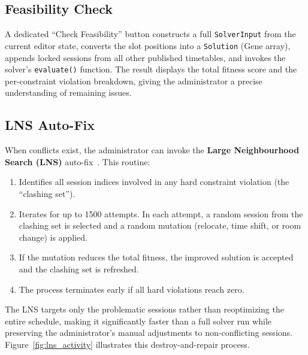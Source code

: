 \subsection{Feasibility Check}

A dedicated ``Check Feasibility'' button constructs a full \texttt{SolverInput} from the current editor state, converts the slot positions into a \texttt{Solution} (Gene array), appends locked sessions from all other published timetables, and invokes the solver's \texttt{evaluate()} function. The result displays the total fitness score and the per-constraint violation breakdown, giving the administrator a precise understanding of remaining issues.

\subsection{LNS Auto-Fix}

When conflicts exist, the administrator can invoke the \textbf{Large Neighbourhood Search (LNS)} auto-fix~\cite{shaw1998using}. This routine:
\begin{enumerate}
    \item Identifies all session indices involved in any hard constraint violation (the ``clashing set'').
    \item Iterates for up to 1500 attempts. In each attempt, a random session from the clashing set is selected and a random mutation (relocate, time shift, or room change) is applied.
    \item If the mutation reduces the total fitness, the improved solution is accepted and the clashing set is refreshed.
    \item The process terminates early if all hard violations reach zero.
\end{enumerate}

The LNS targets only the problematic sessions rather than reoptimizing the entire schedule, making it significantly faster than a full solver run while preserving the administrator's manual adjustments to non-conflicting sessions. Figure~\ref{fig:lns_activity} illustrates this destroy-and-repair process.


